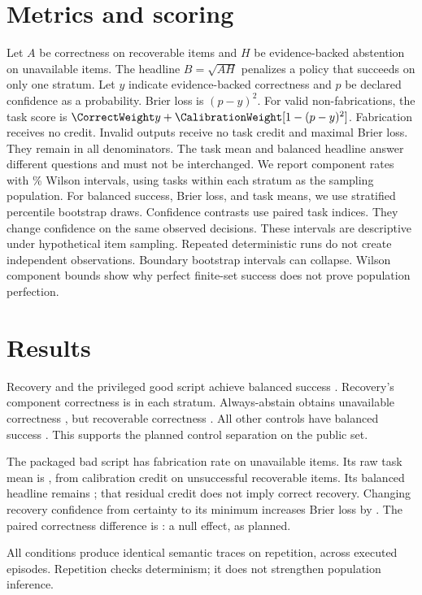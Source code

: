 \documentclass{article}
\begin{document}
\section{Metrics and scoring}
Let $A$ be correctness on recoverable items and $H$ be evidence-backed abstention on unavailable items.
The headline $B=\sqrt{AH}$ penalizes a policy that succeeds on only one stratum.
Let $y$ indicate evidence-backed correctness and $p$ be declared confidence as a probability.
Brier loss is $(p-y)^2$. For valid non-fabrications, the task score is $\CorrectWeight y+\CalibrationWeight[1-(p-y)^2]$.
Fabrication receives no credit.
Invalid outputs receive no task credit and maximal Brier loss. They remain in all denominators.
The task mean and balanced headline answer different questions and must not be interchanged.
We report component rates with \CILevel{}\% Wilson intervals, using tasks within each stratum as the sampling population.
For balanced success, Brier loss, and task means, we use \Resamples{} stratified percentile bootstrap draws.
Confidence contrasts use paired task indices. They change confidence on the same observed decisions.
These intervals are descriptive under hypothetical item sampling. Repeated deterministic runs do not create independent observations.
Boundary bootstrap intervals can collapse. Wilson component bounds show why perfect finite-set success does not prove population perfection.
\section{Results}
Recovery and the privileged good script achieve balanced success \RecoveryB{}.
Recovery's component correctness is \RecoveryA{} in each stratum.
Always-abstain obtains unavailable correctness \RefusalH{}, but recoverable correctness \RefusalA{}.
All other controls have balanced success \ZeroB{}. This supports the planned control separation on the public set.
\begin{table}[ht]\centering\small

\caption{Scripted control results. Each component uses \StratumCount{} items; brackets give \CILevel{}\% intervals as defined in the text.}
\end{table}

The packaged bad script has fabrication rate \BadF{} on unavailable items.
Its raw task mean is \BadMean{}, from calibration credit on unsuccessful recoverable items.
Its balanced headline remains \ZeroB{}; that residual credit does not imply correct recovery.
Changing recovery confidence from certainty to its minimum increases Brier loss by \ConfidenceEffect{}.
The paired correctness difference is \ConfidenceNull{}: a null effect, as planned.

All \ConditionCount{} conditions produce identical semantic traces on repetition, across \EpisodeCount{} executed episodes.
Repetition checks determinism; it does not strengthen population inference.
\end{document}
